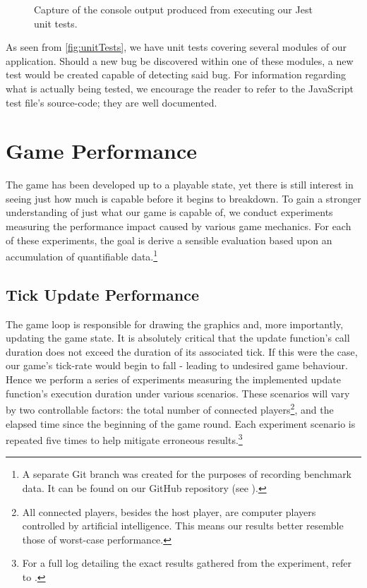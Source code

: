 \documentclass{standalone}
\begin{document}
		\begin{figure}[!htbp]
			\begin{formal}
				
			\end{formal}
			\caption{Capture of the console output produced from executing our Jest unit tests.} \label{fig:unitTests}
		\end{figure}

		As seen from \autoref{fig:unitTests}, we have unit tests covering several modules of our application. Should a new bug be discovered within one of these modules, a new test would be created capable of detecting said bug. For information regarding what is actually being tested, we encourage the reader to refer to the JavaScript test file's source-code; they are well documented.

	\section{Game Performance}
		The game has been developed up to a playable state, yet there is still interest in seeing just how much is capable before it begins to breakdown. To gain a stronger understanding of just what our game is capable of, we conduct experiments measuring the performance impact caused by various game mechanics. For each of these experiments, the goal is derive a sensible evaluation based upon an accumulation of quantifiable data.\footnote{A separate Git branch was created for the purposes of recording benchmark data. It can be found on our GitHub repository (see ).}

		\subsection{Tick Update Performance} \label{sec:tickUpdatePerformance}
			The game loop is responsible for drawing the graphics and, more importantly, updating the game state. It is absolutely critical that the update function's call duration does not exceed the duration of its associated tick. If this were the case, our game's tick-rate would begin to fall - leading to undesired game behaviour. Hence we perform a series of experiments measuring the implemented update function's execution duration under various scenarios. These scenarios will vary by two controllable factors: the total number of connected players\footnote{All connected players, besides the host player, are computer players controlled by artificial intelligence. This means our results better resemble those of worst-case performance.}, and the elapsed time since the beginning of the game round. Each experiment scenario is repeated five times to help mitigate erroneous results.\footnote{For a full log detailing the exact results gathered from the experiment, refer to .}
\end{document}
